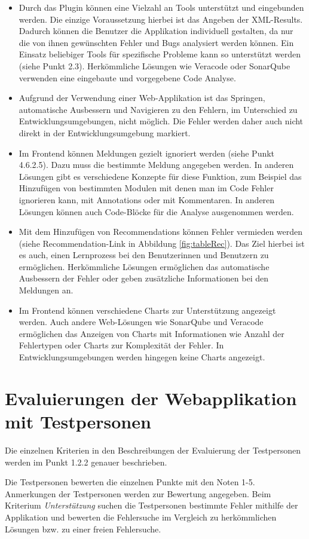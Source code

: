 \begin{itemize}
\item Durch das Plugin können eine Vielzahl an Tools unterstützt und eingebunden werden. Die einzige Voraussetzung hierbei ist das Angeben der XML-Results. Dadurch können die Benutzer die Applikation individuell gestalten, da nur die von ihnen gewünschten Fehler und Bugs analysiert werden können. Ein Einsatz beliebiger Tools für spezifische Probleme kann so unterstützt werden (siehe Punkt 2.3). Herkömmliche Lösungen wie Veracode oder SonarQube verwenden eine eingebaute und vorgegebene Code Analyse.
\item Aufgrund der Verwendung einer Web-Applikation ist das Springen, automatische Ausbessern und Navigieren zu den Fehlern, im Unterschied zu Entwicklungsumgebungen, nicht möglich. Die Fehler werden daher auch nicht direkt in der Entwicklungsumgebung markiert.
\item Im Frontend können Meldungen gezielt ignoriert werden (siehe Punkt 4.6.2.5). Dazu muss die bestimmte Meldung angegeben werden. In anderen Lösungen gibt es verschiedene Konzepte für diese Funktion, zum Beispiel das Hinzufügen von bestimmten Modulen mit denen man im Code Fehler ignorieren kann, mit Annotations oder mit Kommentaren. In anderen Lösungen können auch Code-Blöcke für die Analyse ausgenommen werden.
\item Mit dem Hinzufügen von Recommendations können Fehler vermieden werden (siehe Recommendation-Link in Abbildung \ref{fig:tableRec}). Das Ziel hierbei ist es auch, einen Lernprozess bei den Benutzerinnen und Benutzern zu ermöglichen. Herkömmliche Lösungen ermöglichen das automatische Ausbessern der Fehler oder geben zusätzliche  Informationen bei den Meldungen an.



\item Im Frontend können verschiedene Charts zur Unterstützung angezeigt werden. Auch andere Web-Lösungen wie SonarQube und Veracode ermöglichen das Anzeigen von Charts mit Informationen wie Anzahl der Fehlertypen oder Charts zur Komplexität der Fehler. In Entwicklungsumgebungen werden hingegen keine Charts angezeigt.
\end{itemize}
\section{Evaluierungen der Webapplikation mit Testpersonen} 
Die einzelnen Kriterien in den Beschreibungen der Evaluierung der Testpersonen werden im Punkt 1.2.2 genauer beschrieben. 

Die Testpersonen bewerten die einzelnen Punkte mit den Noten 1-5. Anmerkungen der Testpersonen werden zur Bewertung angegeben. Beim Kriterium \textit{Unterstützung} suchen die Testpersonen bestimmte Fehler  mithilfe der Applikation und bewerten die Fehlersuche im Vergleich zu herkömmlichen Lösungen bzw. zu einer freien Fehlersuche.
